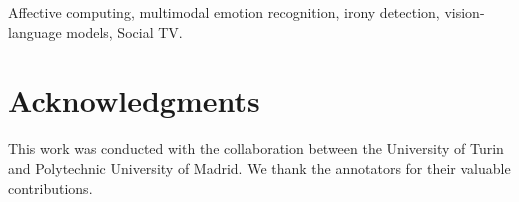 \documentclass[letterpaper,journal]{IEEEtran}
\begin{document}
\begin{IEEEkeywords}
Affective computing, multimodal emotion recognition, irony detection, vision-language models, Social TV.
\end{IEEEkeywords}








\section*{Acknowledgments}
This work was conducted with the collaboration between the University of Turin and Polytechnic University of Madrid. We thank the annotators for their valuable contributions.

\balance

\end{document}
